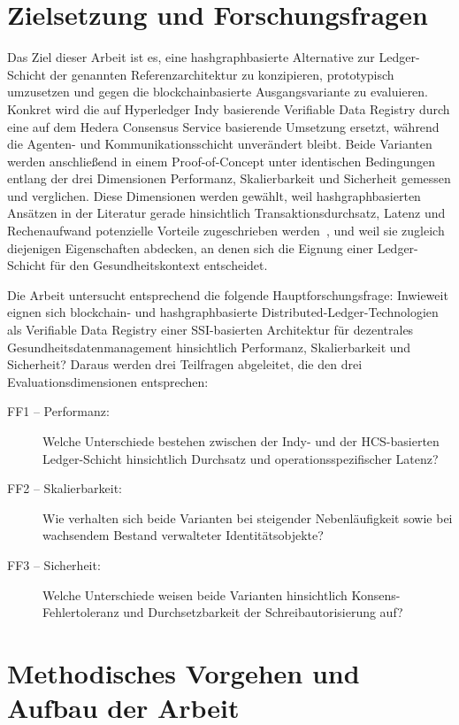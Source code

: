 \section{Zielsetzung und Forschungsfragen}
\label{sec:einleitung-zielsetzung}

Das Ziel dieser Arbeit ist es, eine hashgraphbasierte Alternative zur Ledger-Schicht der genannten Referenzarchitektur zu konzipieren, prototypisch umzusetzen und gegen die blockchainbasierte Ausgangsvariante zu evaluieren. Konkret wird die auf Hyperledger Indy basierende Verifiable Data Registry durch eine auf dem Hedera Consensus Service basierende Umsetzung ersetzt, während die Agenten- und Kommunikationsschicht unverändert bleibt. Beide Varianten werden anschließend in einem Proof-of-Concept unter identischen Bedingungen entlang der drei Dimensionen Performanz, Skalierbarkeit und Sicherheit gemessen und verglichen. Diese Dimensionen werden gewählt, weil hashgraphbasierten Ansätzen in der Literatur gerade hinsichtlich Transaktionsdurchsatz, Latenz und Rechenaufwand potenzielle Vorteile zugeschrieben werden~\cite{akhtar2019}, und weil sie zugleich diejenigen Eigenschaften abdecken, an denen sich die Eignung einer Ledger-Schicht für den Gesundheitskontext entscheidet.

Die Arbeit untersucht entsprechend die folgende Hauptforschungsfrage: Inwieweit eignen sich blockchain- und hashgraphbasierte Distributed-Ledger-Technologien als Verifiable Data Registry einer SSI-basierten Architektur für dezentrales Gesundheitsdatenmanagement hinsichtlich Performanz, Skalierbarkeit und Sicherheit? Daraus werden drei Teilfragen abgeleitet, die den drei Evaluationsdimensionen entsprechen:

\begin{description}
  \item[FF1 -- Performanz:] Welche Unterschiede bestehen zwischen der Indy- und der HCS-basierten Ledger-Schicht hinsichtlich Durchsatz und operationsspezifischer Latenz?
  \item[FF2 -- Skalierbarkeit:] Wie verhalten sich beide Varianten bei steigender Nebenläufigkeit sowie bei wachsendem Bestand verwalteter Identitätsobjekte?
  \item[FF3 -- Sicherheit:] Welche Unterschiede weisen beide Varianten hinsichtlich Konsens-Fehlertoleranz und Durchsetzbarkeit der Schreibautorisierung auf?
\end{description}


\section{Methodisches Vorgehen und Aufbau der Arbeit}
\label{sec:einleitung-aufbau}

